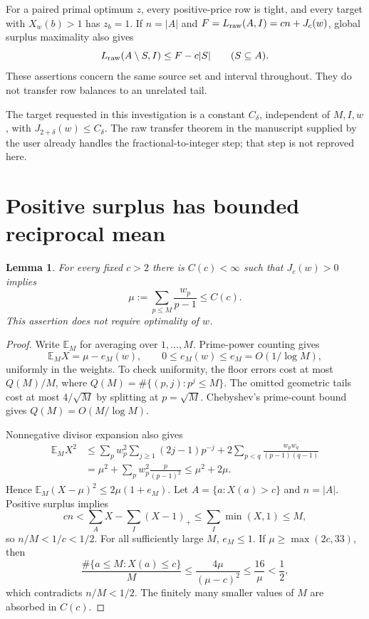 \documentclass[11pt,a4paper]{article}
\newtheorem{lemma}[theorem]{Lemma}
\newcommand{\pos}[1]{\left(#1\right)_+}
\newcommand{\E}{\mathbb E_M}
\newcommand{\LP}{L_{\rm raw}}
\begin{document}
For a paired primal optimum $z$, every positive-price row is tight,
and every target with $X_w(b)>1$ has $z_b=1$. If $n=|A|$ and
$F=\LP(A,I)=cn+J_c(w)$, global surplus maximality also gives
\begin{equation}
 \LP(A\setminus S,I)\le F-c|S|\qquad(S\subseteq A).     \label{eq:deletion}
\end{equation}
These assertions concern the same source set and interval throughout.
They do not transfer row balances to an unrelated tail.

The target requested in this investigation is a constant $C_\delta$,
independent of $M,I,w$, with $J_{2+\delta}(w)\le C_\delta$.
The raw transfer theorem in the manuscript supplied by the user
\cite{WangTransfer} already handles the fractional-to-integer step;
that step is not reproved here.

\section{Positive surplus has bounded reciprocal mean}

\begin{lemma}\label{lem:mean}
For every fixed $c>2$ there is $C(c)<\infty$ such that
$J_c(w)>0$ implies
\[
 \mu:=\sum_{p\le M}\frac{w_p}{p-1}\le C(c).
\]
This assertion does not require optimality of $w$.
\end{lemma}
\begin{proof}
Write $\E$ for averaging over $1,\ldots,M$. Prime-power counting gives
\[
 \E X=\mu-e_M(w),\qquad 0\le e_M(w)\le e_M=O(1/\log M),
\]
uniformly in the weights. To check uniformity, the floor errors cost at
most $Q(M)/M$, where $Q(M)=\#\{(p,j):p^j\le M\}$.
The omitted geometric tails cost at most $4/\sqrt M$ by splitting
at $p=\sqrt M$. Chebyshev's prime-count bound gives
$Q(M)=O(M/\log M)$.

Nonnegative divisor expansion also gives
\[
 \begin{split}
 \E X^2
 &\le \sum_p w_p^2\sum_{j\ge1}(2j-1)p^{-j}
       +2\sum_{p<q}\frac{w_pw_q}{(p-1)(q-1)}\\
 &=\mu^2+\sum_p w_p^2\frac p{(p-1)^2}
 \le\mu^2+2\mu.
 \end{split}
\]
Hence $\E(X-\mu)^2\le2\mu(1+e_M)$. Let
$A=\{a:X(a)>c\}$ and $n=|A|$. Positive surplus implies
\[
 cn<\sum_A X-\sum_I\pos{X-1}
 \le\sum_I\min(X,1)\le M,
\]
so $n/M<1/c<1/2$. For all sufficiently large $M$, $e_M\le1$.
If $\mu\ge\max(2c,33)$, then
\[
 \frac{\#\{a\le M:X(a)\le c\}}M
 \le\frac{4\mu}{(\mu-c)^2}\le\frac{16}{\mu}<\frac12,
\]
which contradicts $n/M<1/2$. The finitely many smaller values of $M$
are absorbed in $C(c)$.
\end{proof}
\end{document}
